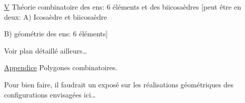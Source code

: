 
\uline{V} Théorie combinatoire des ens: 6 éléments et des biicosaèdres [peut être  en deux: A) Icosaèdre et biicosaèdre

B) géométrie des ens: 6 éléments]

Voir plan détaillé ailleurs\ldots


\uline{Appendice} Polygones combinatoires.

Pour bien faire, il faudrait un exposé sur les réalisations géométriques des configurations envisagées ici\ldots
